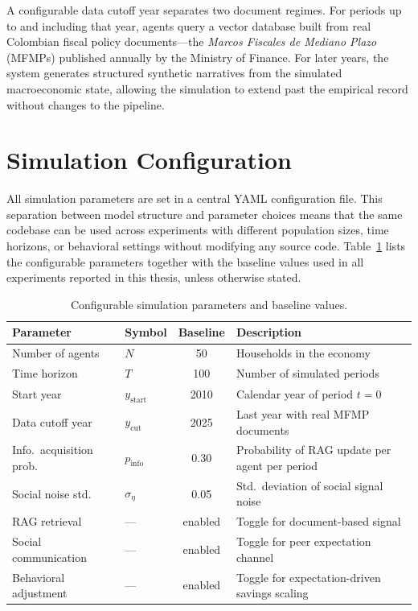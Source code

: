A configurable data cutoff year separates two document regimes. For periods up to and including that year, agents query a vector database built from real Colombian fiscal policy documents---the \textit{Marcos Fiscales de Mediano Plazo} (MFMPs) published annually by the Ministry of Finance. For later years, the system generates structured synthetic narratives from the simulated macroeconomic state, allowing the simulation to extend past the empirical record without changes to the pipeline.

\section{Simulation Configuration}
\label{sec:sim_config}

All simulation parameters are set in a central YAML configuration file. This separation between model structure and parameter choices means that the same codebase can be used across experiments with different population sizes, time horizons, or behavioral settings without modifying any source code. Table~\ref{tab:sim_params} lists the configurable parameters together with the baseline values used in all experiments reported in this thesis, unless otherwise stated.

\begin{table}[htbp]
    \centering
    \caption{Configurable simulation parameters and baseline values.}
    \label{tab:sim_params}
    \begin{tabular}{llcl}
        \hline
        \textbf{Parameter} & \textbf{Symbol} & \textbf{Baseline} & \textbf{Description} \\
        \hline
        Number of agents          & $N$                  & 50      & Households in the economy \\
        Time horizon              & $T$                  & 100     & Number of simulated periods \\
        Start year                & $y_{\text{start}}$   & 2010    & Calendar year of period $t = 0$ \\
        Data cutoff year          & $y_{\text{cut}}$     & 2025    & Last year with real MFMP documents \\
        Info.\ acquisition prob.\ & $p_{\text{info}}$    & 0.30    & Probability of RAG update per agent per period \\
        Social noise std.\        & $\sigma_\eta$        & 0.05    & Std.\ deviation of social signal noise \\
        RAG retrieval             & ---                  & enabled & Toggle for document-based signal \\
        Social communication      & ---                  & enabled & Toggle for peer expectation channel \\
        Behavioral adjustment     & ---                  & enabled & Toggle for expectation-driven savings scaling \\
        \hline
    \end{tabular}
\end{table}

